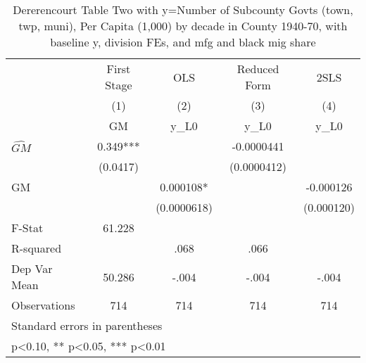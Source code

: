 \begin{table}[htbp]\centering
\def\sym#1{\ifmmode^{#1}\else\(^{#1}\)\fi}
\caption{Dererencourt Table Two with y=Number of Subcounty Govts (town, twp, muni), Per Capita (1,000) by decade in County 1940-70, with baseline y, division FEs, and mfg and black mig share}
\begin{tabular}{l*{4}{c}}
\toprule
                    & First Stage   &         OLS   &Reduced Form   &        2SLS   \\
                    &\multicolumn{1}{c}{(1)}&\multicolumn{1}{c}{(2)}&\multicolumn{1}{c}{(3)}&\multicolumn{1}{c}{(4)}\\
                    &\multicolumn{1}{c}{GM}&\multicolumn{1}{c}{y\_L0}&\multicolumn{1}{c}{y\_L0}&\multicolumn{1}{c}{y\_L0}\\
\midrule
$\hat{GM}$          &       0.349***&               &  -0.0000441   &               \\
                    &    (0.0417)   &               & (0.0000412)   &               \\
\addlinespace
GM                  &               &    0.000108*  &               &   -0.000126   \\
                    &               & (0.0000618)   &               &  (0.000120)   \\
\midrule
F-Stat              &      61.228   &               &               &               \\
R-squared           &               &        .068   &        .066   &               \\
Dep Var Mean        &      50.286   &       -.004   &       -.004   &       -.004   \\
Observations        &         714   &         714   &         714   &         714   \\
\bottomrule
\multicolumn{5}{l}{\footnotesize Standard errors in parentheses}\\
\multicolumn{5}{l}{\footnotesize * p<0.10, ** p<0.05, *** p<0.01}\\
\end{tabular}
\end{table}
